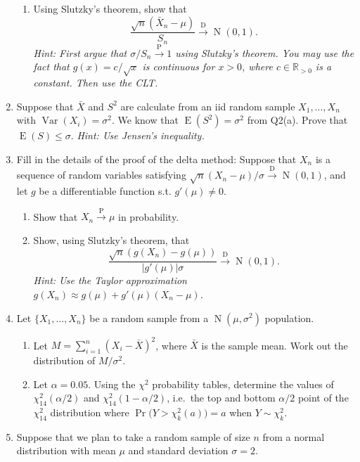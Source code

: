 \documentclass[
]{book}
\DeclareMathOperator{\E}{E}
\DeclareMathOperator{\Var}{Var}
\DeclareMathOperator{\N}{N}
\newcommand{\bbR}{\mathbb{R}}
\theoremstyle{definition}
\theoremstyle{definition}
\theoremstyle{definition}
\theoremstyle{definition}
\theoremstyle{remark}
\begin{document}
\begin{enumerate}
\begin{enumerate}
  \item
    Using Slutzky's theorem, show that
    \[
       \frac{\sqrt n(\bar X_n - \mu)}{S_n} \xrightarrow{\text{ D }} \N(0,1).
     \]
    \emph{Hint: First argue that \(\sigma/S_n \xrightarrow{\text{P}} 1\) using Slutzky's theorem. You may use the fact that \(g(x)=c/\sqrt{x}\) is continuous for \(x>0\), where \(c\in\bbR_{>0}\) is a constant. Then use the CLT.}
  \end{enumerate}
\item
  Suppose that \(\bar X\) and \(S^2\) are calculate from an iid random sample \(X_1,\dots,X_n\) with \(\Var(X_i)=\sigma^2\). We know that \(\E(S^2)=\sigma^2\) from Q2(a). Prove that \(\E(S)\leq \sigma\). \emph{Hint: Use Jensen's inequality.}
\item
  Fill in the details of the proof of the delta method: Suppose that \(X_n\) is a sequence of random variables satisfying \(\sqrt n (X_n-\mu)/\sigma \xrightarrow{\text{D}}\N(0,1)\), and let \(g\) be a differentiable function s.t. \(g'(\mu)\neq 0\).

  \begin{enumerate}
  \def\labelenumii{(\alph{enumii})}
  \item
    Show that \(X_n \xrightarrow{\text{P}} \mu\) in probability.
  \item
    Show, using Slutzky's theorem, that
    \[
       \frac{\sqrt n(g(X_n) - g(\mu))  }{|g'(\mu)|\sigma} \xrightarrow{\text{ D }} \N(0,1).
     \]
    \emph{Hint: Use the Taylor approximation \(g(X_n)\approx g(\mu)+g'(\mu)(X_n-\mu)\).}
  \end{enumerate}
\item
  Let \(\{X_1,\dots,X_n\}\) be a random sample from a \(\N(\mu,\sigma^2)\) population.

  \begin{enumerate}
  \def\labelenumii{(\alph{enumii})}
  \item
    Let \(M=\sum_{i=1}^n (X_i - \bar X)^2\), where \(\bar X\) is the sample mean. Work out the distribution of \(M/\sigma^2\).
  \item
    Let \(\alpha = 0.05\). Using the \(\chi^2\) probability tables, determine the values of \(\chi^2_{14}(\alpha/2)\) and \(\chi^2_{14}(1-\alpha/2)\), i.e.~the top and bottom \(\alpha/2\) point of the \(\chi^2_{14}\) distribution where \(\Pr\big(Y > \chi^2_{k}(a)\big) = a\) when \(Y\sim\chi^2_k\).
  \end{enumerate}
\item
  Suppose that we plan to take a random sample of size \(n\) from a normal distribution with mean \(\mu\) and standard deviation \(\sigma=2\).


\end{enumerate}
\end{document}
